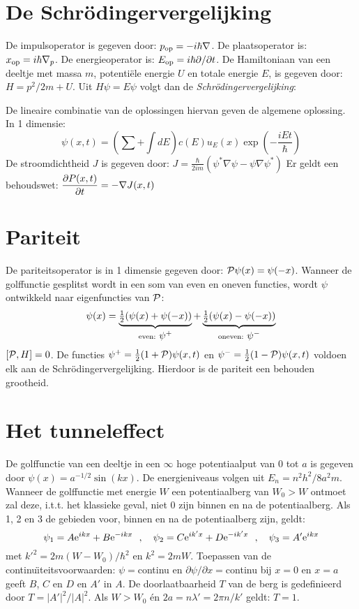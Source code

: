 \section[~~De Schr\"odingervergelijking]{De Schr\"odingervergelijking}
De impulsoperator is gegeven door: $p_{\rm op}=-i\hbar\nabla$. De
plaatsoperator is: $x_{\rm op}=i\hbar\nabla_p$. De energieoperator is:
$E_{\rm op}=i\hbar\partial/\partial t$. De Hamiltoniaan van een deeltje met
massa $m$, potenti\"ele energie $U$ en totale energie $E$, is gegeven door:
$H=p^2/2m+U$. Uit $H\psi=E\psi$ volgt dan de {\it Schr\"odingervergelijking}:
\begin{center}
\end{center}
De lineaire combinatie van de oplossingen hiervan geven de algemene
oplossing. In 1 dimensie:
\[
\psi(x,t)=\left(\sum+\int dE\right)c(E)u_E(x)\exp\left(-\frac{iEt}{\hbar}\right)
\]
De stroomdichtheid $J$ is gegeven door:
$\displaystyle J=\frac{\hbar}{2im}(\psi^*\nabla\psi-\psi\nabla\psi^*)$
\npar
Er geldt een behoudswet: $\displaystyle\frac{\partial P(x,t)}{\partial t}=-\nabla J(x,t)$

\section[~~Pariteit]{Pariteit}
De pariteitsoperator is in 1 dimensie gegeven door: ${\cal P}\psi(x)=\psi(-x)$.
Wanneer de golffunctie gesplitst wordt in een som van even en oneven functies,
wordt $\psi$ ontwikkeld naar eigenfuncties van $\cal P$:
\[
\psi(x)=
\underbrace{\mbox{$\frac{1}{2}$}(\psi(x)+\psi(-x))}_{\rm even:~\hbox{$\psi^+$}}+
\underbrace{\mbox{$\frac{1}{2}$}(\psi(x)-\psi(-x))}_{\rm oneven:~\hbox{$\psi^-$}}
\]
$[{\cal P},H]=0$. De functies $\psi^+=\mbox{$\frac{1}{2}$}(1+{\cal P})\psi(x,t)$ en
$\psi^-=\mbox{$\frac{1}{2}$}(1-{\cal P})\psi(x,t)$ voldoen elk aan de\newline
Schr\"odingervergelijking. Hierdoor is de pariteit een behouden grootheid.

\section[~~Het tunneleffect]{Het tunneleffect}
De golffunctie van een deeltje in een $\infty$ hoge potentiaalput van 0 tot
$a$ is gegeven door $\psi(x)=a^{-1/2}\sin(kx)$. De energieniveaus volgen uit
$E_n=n^2h^2/8a^2m$.
\npar
Wanneer de golffunctie met energie $W$ een potentiaalberg van $W_0>W$
ontmoet zal deze, i.t.t. het klassieke geval, niet 0 zijn binnen en na de
potentiaalberg. Als 1, 2 en 3 de gebieden voor, binnen en na de potentiaalberg
zijn, geldt:
\[
\psi_1=A{\rm e}^{ikx}+B{\rm e}^{-ikx}~~,~~~
\psi_2=C{\rm e}^{ik'x}+D{\rm e}^{-ik'x}~~,~~~\psi_3=A'{\rm e}^{ikx}
\]
met $k'^2=2m(W-W_0)/\hbar^2$ en $k^2=2mW$. Toepassen van de
continu\"{\i}teitsvoorwaarden: $\psi=$continu en $\partial\psi/\partial x=$continu
bij $x=0$ en $x=a$ geeft $B$, $C$ en $D$ en $A'$ in $A$. De doorlaatbaarheid
$T$ van de berg is gedefinieerd door $T=|A'|^2/|A|^2$. Als $W>W_0$ \'en
$2a=n\lambda'=2\pi n/k'$ geldt: $T=1$.

